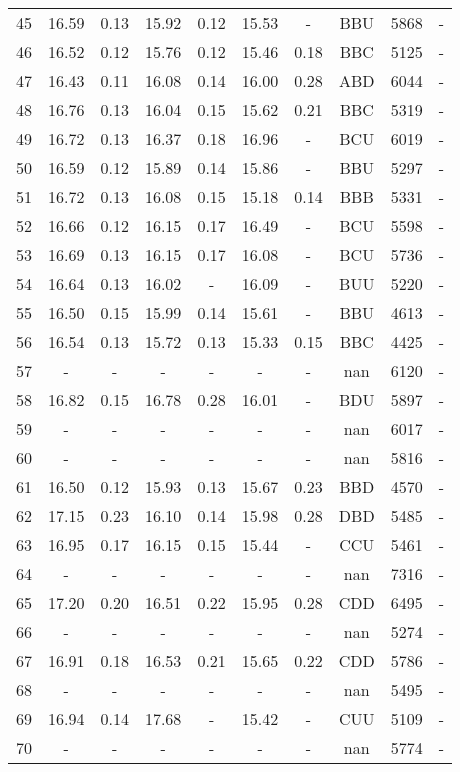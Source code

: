 \begin{longtable}{cccccccccc}
 45 & 16.59 & 0.13 & 15.92 & 0.12 & 15.53 & - & BBU & 5868 & -\\
 46 & 16.52 & 0.12 & 15.76 & 0.12 & 15.46 & 0.18 & BBC & 5125 & -\\
 47 & 16.43 & 0.11 & 16.08 & 0.14 & 16.00 & 0.28 & ABD & 6044 & -\\
 48 & 16.76 & 0.13 & 16.04 & 0.15 & 15.62 & 0.21 & BBC & 5319 & -\\
 49 & 16.72 & 0.13 & 16.37 & 0.18 & 16.96 & - & BCU & 6019 & -\\
 50 & 16.59 & 0.12 & 15.89 & 0.14 & 15.86 & - & BBU & 5297 & -\\
 51 & 16.72 & 0.13 & 16.08 & 0.15 & 15.18 & 0.14 & BBB & 5331 & -\\
 52 & 16.66 & 0.12 & 16.15 & 0.17 & 16.49 & - & BCU & 5598 & -\\
 53 & 16.69 & 0.13 & 16.15 & 0.17 & 16.08 & - & BCU & 5736 & -\\
 54 & 16.64 & 0.13 & 16.02 & - & 16.09 & - & BUU & 5220 & -\\
 55 & 16.50 & 0.15 & 15.99 & 0.14 & 15.61 & - & BBU & 4613 & -\\
 56 & 16.54 & 0.13 & 15.72 & 0.13 & 15.33 & 0.15 & BBC & 4425 & -\\
 57 & - & - & - & - & - & - & nan & 6120 & -\\
 58 & 16.82 & 0.15 & 16.78 & 0.28 & 16.01 & - & BDU & 5897 & -\\
 59 & - & - & - & - & - & - & nan & 6017 & -\\
 60 & - & - & - & - & - & - & nan & 5816 & -\\
 61 & 16.50 & 0.12 & 15.93 & 0.13 & 15.67 & 0.23 & BBD & 4570 & -\\
 62 & 17.15 & 0.23 & 16.10 & 0.14 & 15.98 & 0.28 & DBD & 5485 & -\\
 63 & 16.95 & 0.17 & 16.15 & 0.15 & 15.44 & - & CCU & 5461 & -\\
 64 & - & - & - & - & - & - & nan & 7316 & -\\
 65 & 17.20 & 0.20 & 16.51 & 0.22 & 15.95 & 0.28 & CDD & 6495 & -\\
 66 & - & - & - & - & - & - & nan & 5274 & -\\
 67 & 16.91 & 0.18 & 16.53 & 0.21 & 15.65 & 0.22 & CDD & 5786 & -\\
 68 & - & - & - & - & - & - & nan & 5495 & -\\
 69 & 16.94 & 0.14 & 17.68 & - & 15.42 & - & CUU & 5109 & -\\
 70 & - & - & - & - & - & - & nan & 5774 & -\\

\end{longtable}
